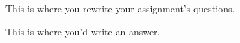 \documentclass[11pt]{article}
\begin{document}
\begin{multicols}{2} %

\begin{question}
  This is where you rewrite your assignment's questions.
\end{question}

\begin{answer}
  This is where you'd write an answer.
\end{answer}


\end{multicols} %
\end{document}
